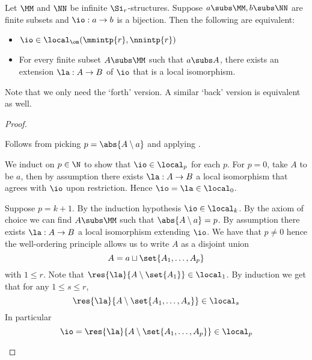 \begin{prop}
    Let $\MM$ and $\NN$ be infinite $\Si_r$-structures.
    Suppose $a \subs \MM, b \subs \NN$ are finite subsets
    and $\io : a \to b$ is a bijection.
    Then the following are equivalent:
    \begin{itemize}
        \item $\io \in \local_\om(\mmintp{r},\nnintp{r})$
        \item For every finite subset $A \subs \MM$ such that $a \subs A$,
            there exists an extension $\la : A \to B$ of $\io$ 
            that is a local isomorphism.
    \end{itemize}
    
    Note that we only need the `forth' version.
    A similar `back' version is equivalent as well.
\end{prop}
\begin{proof}
    \begin{forward}
        Follows from picking $p = \abs{A \setminus a}$ and applying 
        .
    \end{forward}

    \begin{backward}
    We induct on $p \in \N$ to show that $\io \in \local_p$ for each $p$.
    For $p = 0$,
    take $A$ to be $a$,
    then by assumption there exists $\la : A \to B$ a local isomorphism
    that agrees with $\io$ upon restriction.
    Hence $\io = \la \in \local_0$.

    Suppose $p = k + 1$. 
    By the induction hypothesis $\io \in \local_k$.
    By the axiom of choice we can 
    find $A \subs \MM$ such that 
    $\abs{A \setminus a} = p$.
    By assumption there exists $\la : A \to B$ a local isomorphism
    extending $\io$.
    We have that $p \ne 0$ 
    hence the well-ordering principle allows us to write $A$ as a disjoint union
    \[A = a \sqcup \set{A_1,\dots,A_p}\]
    with $1 \leq r$.
    Note that 
    $\res{\la}{A\setminus \set{A_1}} \in \local_1$.
    By induction we get that for any $1 \leq s \leq r$,
    \[\res{\la}{A\setminus \set{A_1,\dots, A_s}} \in \local_s\]
    In particular 
    \[\io = \res{\la}{A \setminus \set{A_1,\dots, A_p}} \in \local_p\]
    \end{backward}
\end{proof}

